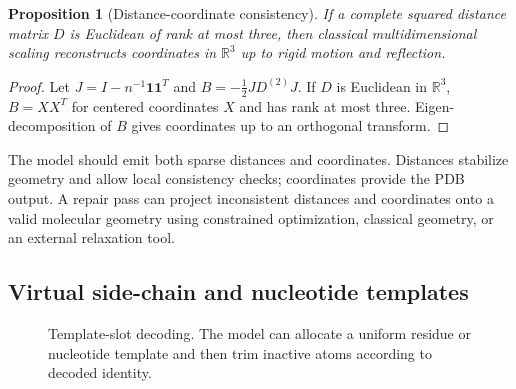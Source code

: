 \documentclass[11pt]{article}
\newtheorem{proposition}[definition]{Proposition}
\newcommand{\R}{\mathbb{R}}
\newcommand{\1}{\mathbf{1}}
\begin{document}
\begin{proposition}[Distance-coordinate consistency]
If a complete squared distance matrix $D$ is Euclidean of rank at most three, then classical multidimensional scaling reconstructs coordinates in $\R^3$ up to rigid motion and reflection.
\end{proposition}
\begin{proof}
Let $J=I-n^{-1}\mathbf 1\mathbf 1^T$ and $B=-\frac12JD^{(2)}J$. If $D$ is Euclidean in $\R^3$, $B=XX^T$ for centered coordinates $X$ and has rank at most three. Eigen-decomposition of $B$ gives coordinates up to an orthogonal transform.\end{proof}

The model should emit both sparse distances and coordinates. Distances stabilize geometry and allow local consistency checks; coordinates provide the PDB output. A repair pass can project inconsistent distances and coordinates onto a valid molecular geometry using constrained optimization, classical geometry, or an external relaxation tool.

\subsection{Virtual side-chain and nucleotide templates}

\begin{figure}[H]
\centering
{}
\caption{Template-slot decoding. The model can allocate a uniform residue or nucleotide template and then trim inactive atoms according to decoded identity.}
\end{figure}
\end{document}
